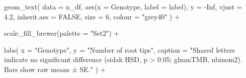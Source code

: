 \documentclass[
  letterpaper,
  DIV=11,
  numbers=noendperiod]{scrartcl}
\newenvironment{Shaded}{\begin{snugshade}}{\end{snugshade}}
\newcommand{\AttributeTok}[1]{\textcolor[rgb]{0.40,0.45,0.13}{#1}}
\newcommand{\ConstantTok}[1]{\textcolor[rgb]{0.56,0.35,0.01}{#1}}
\newcommand{\DecValTok}[1]{\textcolor[rgb]{0.68,0.00,0.00}{#1}}
\newcommand{\FloatTok}[1]{\textcolor[rgb]{0.68,0.00,0.00}{#1}}
\newcommand{\FunctionTok}[1]{\textcolor[rgb]{0.28,0.35,0.67}{#1}}
\newcommand{\NormalTok}[1]{\textcolor[rgb]{0.00,0.23,0.31}{#1}}
\newcommand{\SpecialCharTok}[1]{\textcolor[rgb]{0.37,0.37,0.37}{#1}}
\newcommand{\StringTok}[1]{\textcolor[rgb]{0.13,0.47,0.30}{#1}}
\begin{document}
\begin{Shaded}
\begin{Highlighting}[]
  \FunctionTok{geom\_text}\NormalTok{(}
    \AttributeTok{data        =}\NormalTok{ n\_df,}
    \FunctionTok{aes}\NormalTok{(}\AttributeTok{x =}\NormalTok{ Genotype, }\AttributeTok{label =}\NormalTok{ label),}
    \AttributeTok{y           =} \SpecialCharTok{{-}}\ConstantTok{Inf}\NormalTok{,}
    \AttributeTok{vjust       =} \FloatTok{4.2}\NormalTok{,}
    \AttributeTok{inherit.aes =} \ConstantTok{FALSE}\NormalTok{,}
    \AttributeTok{size        =} \DecValTok{6}\NormalTok{,}
    \AttributeTok{colour      =} \StringTok{"grey40"}
\NormalTok{  ) }\SpecialCharTok{+}

  \FunctionTok{scale\_fill\_brewer}\NormalTok{(}\AttributeTok{palette =} \StringTok{"Set2"}\NormalTok{) }\SpecialCharTok{+}

  \FunctionTok{labs}\NormalTok{(}
    \AttributeTok{x       =} \StringTok{"Genotype"}\NormalTok{,}
    \AttributeTok{y       =} \StringTok{"Number of root tips"}\NormalTok{,}
    \AttributeTok{caption =} \StringTok{"Shared letters indicate no significant difference (sidak HSD, p \textgreater{} 0.05; glmmTMB, nbinom2). Bars show raw means ± SE."}
\NormalTok{  ) }\SpecialCharTok{+}


\end{Highlighting}
\end{Shaded}
\end{document}
